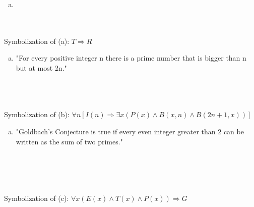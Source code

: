\documentclass{article}
\theoremstyle{definition}
\begin{document}
\begin{enumerate}[(a)]
\item {}
\end{enumerate}
 \\
 \\
Symbolization of (a): \( T \Rightarrow R \)

\begin{enumerate}[(b)]
\item "For every positive integer n there is a prime number that is bigger than n but at most 2n."
\end{enumerate}
 \\
 \\
 \\
Symbolization of (b): \( \forall n [I(n) \Rightarrow \exists x (P(x) \land B(x,n) \land B(2n+1, x ))]  \)

\begin{enumerate}[(c)]
\item "Goldbach's Conjecture is true if every even integer greater than 2 can be written as the sum of two primes."
\end{enumerate}
 \\
 \\
 \\
 \\
Symbolization of (c): \( \forall x ( E(x) \land T(x) \land P(x)) \Rightarrow G \)
\end{document}
